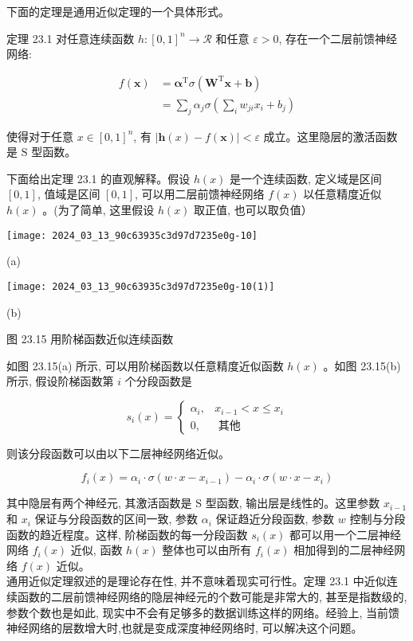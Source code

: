 \documentclass[10pt]{article}
\begin{document}
\begin{CJK*}{UTF8}{bsmi}
下面的定理是通用近似定理的一个具体形式。

定理 23.1 对任意连续函数 $h:[0,1]^{n} \rightarrow \mathcal{R}$ 和任意 $\varepsilon>0$, 存在一个二层前馈神经网络:

$$
\begin{aligned}
f(\boldsymbol{x}) & =\boldsymbol{\alpha}^{\mathrm{T}} \sigma\left(\boldsymbol{W}^{\mathrm{T}} \boldsymbol{x}+\boldsymbol{b}\right) \\
& =\sum_{j} \alpha_{j} \sigma\left(\sum_{i} w_{j i} x_{i}+b_{j}\right)
\end{aligned}
$$

使得对于任意 $x \in[0,1]^{n}$, 有 $|\boldsymbol{h}(x)-f(\boldsymbol{x})|<\varepsilon$ 成立。这里隐层的激活函数是 $\mathrm{S}$ 型函数。

下面给出定理 23.1 的直观解释。假设 $h(x)$ 是一个连续函数, 定义域是区间 $[0,1]$, 值域是区间 $[0,1]$, 可以用二层前馈神经网络 $f(x)$ 以任意精度近似 $h(x)$ 。(为了简单, 这里假设 $h(x)$ 取正值, 也可以取负值）

\begin{center}
\texttt{[image: 2024\_03\_13\_90c63935c3d97d7235e0g-10]}
\end{center}

(a)

\begin{center}
\texttt{[image: 2024\_03\_13\_90c63935c3d97d7235e0g-10(1)]}
\end{center}

(b)

图 23.15 用阶梯函数近似连续函数

如图 23.15(a) 所示, 可以用阶梯函数以任意精度近似函数 $h(x)$ 。如图 23.15(b) 所示, 假设阶梯函数第 $i$ 个分段函数是

$$
s_{i}(x)= \begin{cases}\alpha_{i}, & x_{i-1}<x \leqslant x_{i} \\ 0, & \text { 其他 }\end{cases}
$$

则该分段函数可以由以下二层神经网络近似。

$$
f_{i}(x)=\alpha_{i} \cdot \sigma\left(w \cdot x-x_{i-1}\right)-\alpha_{i} \cdot \sigma\left(w \cdot x-x_{i}\right)
$$

其中隐层有两个神经元, 其激活函数是 $\mathrm{S}$ 型函数, 输出层是线性的。这里参数 $x_{i-1}$ 和 $x_{i}$ 保证与分段函数的区间一致, 参数 $\alpha_{i}$ 保证趋近分段函数, 参数 $w$ 控制与分段函数的趋近程度。这样, 阶梯函数的每一分段函数 $s_{i}(x)$ 都可以用一个二层神经网络 $f_{i}(x)$ 近似, 函数 $h(x)$ 整体也可以由所有 $f_{i}(x)$ 相加得到的二层神经网络 $f(x)$ 近似。\\
通用近似定理叙述的是理论存在性, 并不意味着现实可行性。定理 23.1 中近似连续函数的二层前馈神经网络的隐层神经元的个数可能是非常大的, 甚至是指数级的, 参数个数也是如此, 现实中不会有足够多的数据训练这样的网络。经验上, 当前馈神经网络的层数增大时,也就是变成深度神经网络时, 可以解决这个问题。


\end{CJK*}
\end{document}
